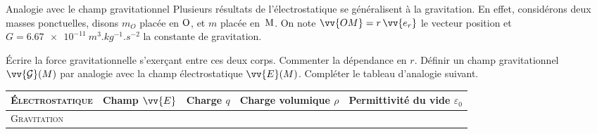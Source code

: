 \begin{exo}[2][TD]{Analogie avec le champ gravitationnel}
Plusieurs résultats de l'électrostatique se généralisent à la gravitation. En effet, considérons deux masses ponctuelles, disons $m_O$ placée en $\rm O$, et $m$ placée en~$\rm M$. On note $\vv{OM}=r\,\vv{e_r}$ le vecteur position et $G=\SI{6,67e-11}{m^3.kg^{-1}.s^{-2}}$ la constante de gravitation.

\begin{questions}
\item Écrire la force gravitationnelle s’exerçant entre ces deux corps. Commenter la dépendance en $r$. Définir un champ gravitationnel $\vv{\mathcal{G}}(M)$ par analogie avec la champ électrostatique $\vv{E}(M)$. Compléter le tableau d’analogie suivant.
\begin{center}
\renewcommand{\arraystretch}{1.3}
\begin{tabular}{|l|l|l|l|l|}
\hline
\textsc{Électrostatique} & Champ $\vv{E}$ & Charge $q$ & Charge volumique $\rho$ & Permittivité du vide $\varepsilon_0$ \\
\hline \textsc{Gravitation} & & & &  \\
\hline
\end{tabular}
\end{center}




\end{questions}
\end{exo}
